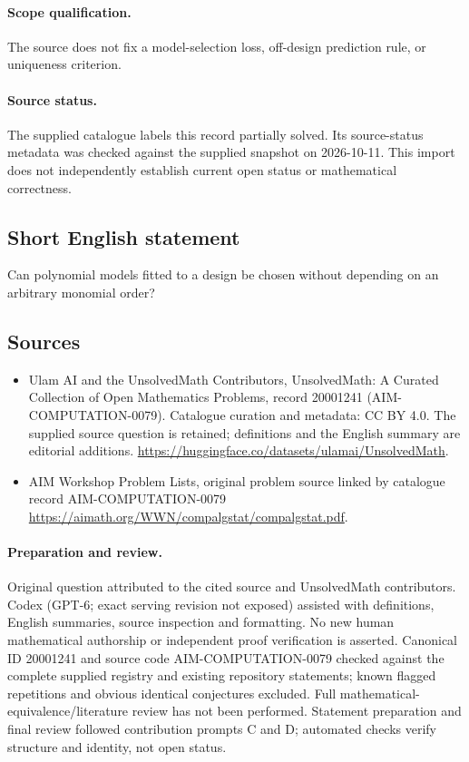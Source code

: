 \documentclass[11pt]{article}
\begin{document}
\paragraph{Scope qualification.}
The source does not fix a model-selection loss, off-design prediction rule, or uniqueness criterion.
\paragraph{Source status.}
The supplied catalogue labels this record partially solved. Its source-status metadata was checked against the supplied snapshot on 2026-10-11. This import does not independently establish current open status or mathematical correctness.
\subsection{Short English statement}
Can polynomial models fitted to a design be chosen without depending on an arbitrary monomial order?
\subsection{Sources}
\begin{itemize}
\item[S1] Ulam AI and the UnsolvedMath Contributors, UnsolvedMath: A Curated Collection of Open Mathematics Problems, record 20001241 (AIM-COMPUTATION-0079). Catalogue curation and metadata: CC BY 4.0. The supplied source question is retained; definitions and the English summary are editorial additions.
\url{https://huggingface.co/datasets/ulamai/UnsolvedMath}.
\item[S2] AIM Workshop Problem Lists, original problem source linked by catalogue record AIM-COMPUTATION-0079
\url{https://aimath.org/WWN/compalgstat/compalgstat.pdf}.
\end{itemize}
\paragraph{Preparation and review.}
Original question attributed to the cited source and UnsolvedMath contributors. Codex (GPT-6; exact serving revision not exposed) assisted with definitions, English summaries, source inspection and formatting. No new human mathematical authorship or independent proof verification is asserted. Canonical ID 20001241 and source code AIM-COMPUTATION-0079 checked against the complete supplied registry and existing repository statements; known flagged repetitions and obvious identical conjectures excluded. Full mathematical-equivalence/literature review has not been performed. Statement preparation and final review followed contribution prompts C and D; automated checks verify structure and identity, not open status.
\label{end:20001241}
\end{document}
